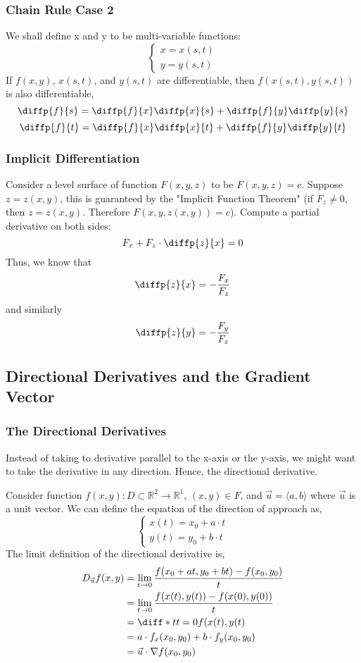\documentclass{article}
\begin{document}
\subsubsection{Chain Rule Case 2}
We shall define x and y to be multi-variable functions:
$$\left\{ \begin{array}{lr}
x = x(s,t) \\
y = y(s,t)
\end{array} \right.$$
If $f(x,y)$, $x(s,t)$, and $y(s,t)$ are differentiable, then $f(x(s,t),y(s,t))$ is also differentiable,
$$\diffp{f}{s} = \diffp{f}{x}\diffp{x}{s} + \diffp{f}{y}\diffp{y}{s}$$
$$\diffp{f}{t} = \diffp{f}{x}\diffp{x}{t} + \diffp{f}{y}\diffp{y}{t}$$

\subsubsection{Implicit Differentiation}
Consider a level surface of function $F(x,y,z)$ to be $F(x,y,z) = c$. Suppose $z = z(x,y)$, this is guaranteed by the "Implicit Function Theorem" (if $F_z \neq 0$, then $z = z(x,y)$. Therefore $F(x,y,z(x,y)) = c$). Compute a partial derivative on both sides:
$$F_x + F_z\cdot\diffp{z}{x} = 0$$
Thus, we know that
$$\diffp{z}{x} = -\frac{F_x}{F_z}$$
and similarly
$$\diffp{z}{y} = -\frac{F_y}{F_z}$$

\subsection{Directional Derivatives and the Gradient Vector}

\subsubsection{The Directional Derivatives}
Instead of taking to derivative parallel to the x-axis or the y-axis, we might want to take the derivative in any direction. Hence, the directional derivative. 

Consider function $f(x,y): D \subset \mathbb{R}^2 \longrightarrow \mathbb{R}^1$, $(x,y) \in F$, and $\vec{u} = \langle a,b \rangle$ where $\vec{u}$ is a unit vector. We can define the equation of the direction of approach as,
$$\left\{ \begin{array}{lr}
x(t) = x_0 + a\cdot t \\
y(t) = y_0 + b\cdot t
\end{array} \right.$$
The limit definition of the directional derivative is,
\begin{align}
    D_{\vec{u}}f(x,y) &= \lim_{t\to 0}{\frac{f(x_0+at,y_0+bt) - f(x_0,y_0)}{t}}\nonumber \\
&= \lim_{t\to0}{\frac{f(x(t),y(t)) - f(x(0),y(0))}{t}}\nonumber \\
&= \diff*{}{t}{t=0}f(x(t),y(t) \nonumber \\
&= a \cdot f_x(x_0,y_0) + b\cdot f_y(x_0,y_0) \nonumber \\
&= \vec{u} \cdot \nabla f(x_0,y_0) \nonumber
\end{align}
\end{document}
